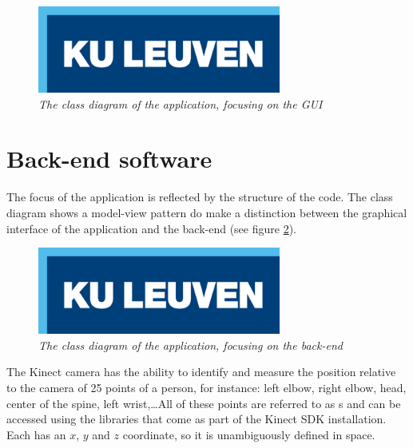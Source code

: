 \begin{figure}[H]
\begin{center}
\includegraphics[width=8cm]{KUL.png} %
\caption{\emph{The class diagram of the application, focusing on the GUI}}
\label{fig: gui_classdiagram}
\end{center}
\end{figure}



\section{Back-end software}
\label{section: Back-end software}

The focus of the application is reflected by the structure of the code. The class diagram shows a model-view pattern do make a distinction between the graphical interface of the application and the back-end (see figure \ref{fig: backend_classdiagram}).\\

\begin{figure}[H]
\begin{center}
\includegraphics[width=8cm]{KUL.png}
\caption{\emph{The class diagram of the application, focusing on the back-end}}
\label{fig: backend_classdiagram}
\end{center}
\end{figure}

The Kinect camera has the ability to identify and measure the position relative to the camera of 25 points of a person, for instance: left elbow, right elbow, head, center of the spine, left wrist,\ldots All of these points are referred to as s and can be accessed using the libraries that come as part of the Kinect SDK installation. Each  has an $x$, $y$ and $z$ coordinate, so it is unambiguously defined in space.\\


